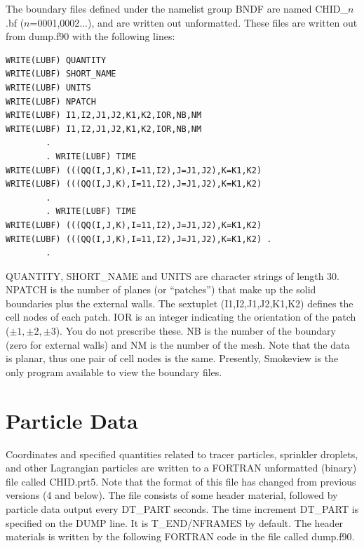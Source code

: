 \documentclass[11pt]{book}
\begin{document}
The boundary files defined under the namelist group {\ct BNDF} are named {\ct CHID\_$n$.bf} ($n$=0001,0002...), and are written out unformatted. These files are written out from {\ct dump.f90} with the following lines:
\begin{lstlisting}
WRITE(LUBF) QUANTITY
WRITE(LUBF) SHORT_NAME
WRITE(LUBF) UNITS
WRITE(LUBF) NPATCH
WRITE(LUBF) I1,I2,J1,J2,K1,K2,IOR,NB,NM
WRITE(LUBF) I1,I2,J1,J2,K1,K2,IOR,NB,NM
        .
        . WRITE(LUBF) TIME
WRITE(LUBF) (((QQ(I,J,K),I=11,I2),J=J1,J2),K=K1,K2)
WRITE(LUBF) (((QQ(I,J,K),I=11,I2),J=J1,J2),K=K1,K2)
        .
        . WRITE(LUBF) TIME
WRITE(LUBF) (((QQ(I,J,K),I=11,I2),J=J1,J2),K=K1,K2)
WRITE(LUBF) (((QQ(I,J,K),I=11,I2),J=J1,J2),K=K1,K2) .
        .
\end{lstlisting}
{\ct QUANTITY}, {\ct SHORT\_NAME} and {\ct UNITS} are character strings of length 30. {\ct NPATCH} is the number of planes (or ``patches'') that make up the solid boundaries plus the external walls. The sextuplet ({\ct I1,I2,J1,J2,K1,K2}) defines the cell nodes of each patch. {\ct IOR} is an integer indicating the orientation of the patch ($\pm 1,\pm 2,\pm 3$). You do not prescribe these. {\ct NB} is the number of the boundary (zero for external walls) and {\ct NM} is the number of the mesh.  Note that the data is planar, thus one pair of cell nodes is the same. Presently, Smokeview is the
only program available to view the boundary files.

\section{Particle Data}
\label{out:PART}

Coordinates and specified quantities related to tracer particles, sprinkler droplets, and other Lagrangian particles are written
to a FORTRAN unformatted (binary) file called {\ct CHID.prt5}.
Note that the format of this file has changed from previous versions (4 and below).
The file consists of some header material, followed by particle data output every
{\ct DT\_PART} seconds. The time increment {\ct DT\_PART} is specified on the
{\ct DUMP} line. It is {\ct T\_END/NFRAMES} by default.
The header materials is written by the following FORTRAN code in the file called {\ct dump.f90}.
\end{document}

